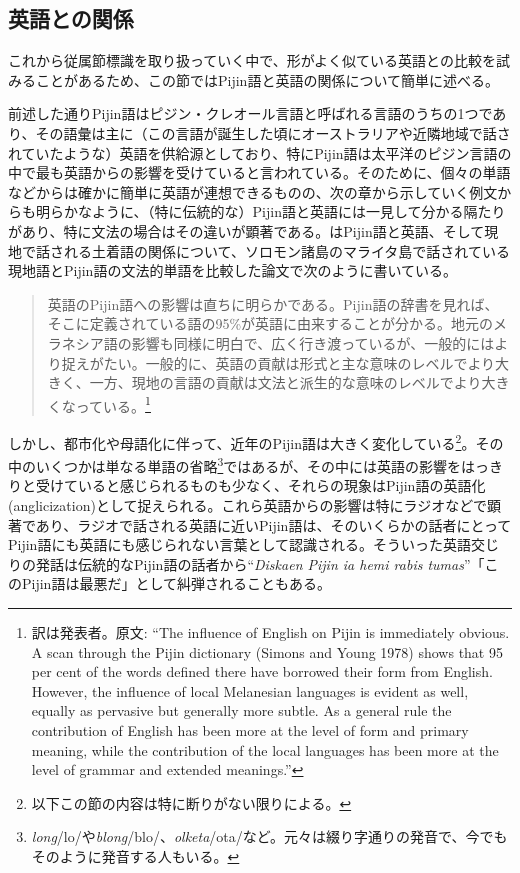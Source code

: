 \subsection{英語との関係}
これから従属節標識を取り扱っていく中で、形がよく似ている英語との比較を試みることがあるため、この節ではPijin語と英語の関係について簡単に述べる。

前述した通りPijin語はピジン・クレオール言語と呼ばれる言語のうちの1つであり、その語彙は主に（この言語が誕生した頃にオーストラリアや近隣地域で話されていたような）英語を供給源としており、特にPijin語は太平洋のピジン言語の中で最も英語からの影響を受けていると言われている\citep{nativization}。そのために、個々の単語などからは確かに簡単に英語が連想できるものの、次の章から示していく例文からも明らかなように、（特に伝統的な）Pijin語と英語には一見して分かる隔たりがあり、特に文法の場合はその違いが顕著である。\cite{malaitan}はPijin語と英語、そして現地で話される土着語の関係について、ソロモン諸島のマライタ島で話されている現地語とPijin語の文法的単語を比較した論文で次のように書いている。

\begin{quotation}
  英語のPijin語への影響は直ちに明らかである。Pijin語の辞書\citep{yumi}を見れば、そこに定義されている語の95\%が英語に由来することが分かる。地元のメラネシア語の影響も同様に明白で、広く行き渡っているが、一般的にはより捉えがたい。一般的に、英語の貢献は形式と主な意味のレベルでより大きく、一方、現地の言語の貢献は文法と派生的な意味のレベルでより大きくなっている。\citep{malaitan}\footnote{訳は発表者。原文: ``The influence of English on Pijin is immediately obvious. A scan through the Pijin dictionary (Simons and Young 1978) shows that 95 per cent of the words defined there have borrowed their form from English. However, the influence of local Melanesian languages is evident as well, equally as pervasive but generally more subtle. As a general rule the contribution of English has been more at the level of form and primary meaning, while the contribution of the local languages has been more at the level of grammar and extended meanings.''}
\end{quotation}

しかし、都市化や母語化に伴って、近年のPijin語は大きく変化している\footnote{
以下この節の内容は特に断りがない限り\cite{nativization}による。}。その中のいくつかは単なる単語の省略\footnote{
\textit{long}/lo/や\textit{blong}/blo/、\textit{olketa}/ota/など。元々は綴り字通りの発音で、今でもそのように発音する人もいる。}ではあるが、その中には英語の影響をはっきりと受けていると感じられるものも少なく、それらの現象はPijin語の英語化(anglicization)として捉えられる。これら英語からの影響は特にラジオなどで顕著であり、ラジオで話される英語に近いPijin語は、そのいくらかの話者にとってPijin語にも英語にも感じられない言葉として認識される。そういった英語交じりの発話は伝統的なPijin語の話者から``\textit{Diskaen Pijin ia hemi rabis tumas}''「このPijin語は最悪だ」として糾弾されることもある。

